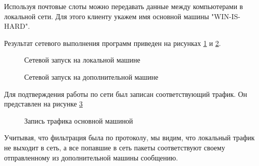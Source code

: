 \documentclass[a4paper]{article}
\begin{document}
	Используя почтовые слоты можно передавать данные между компьютерами в локальной сети. Для этого клиенту укажем имя основной машины "WIN-IS-HARD".
	
	Результат сетевого выполнения программ приведен на рисунках \ref{img:task9_net_local} и \ref{img:task9_net_remote}.
	\begin{figure}[h!]
		\caption{Сетевой запуск на локальной машине}
		\label{img:task9_net_local}
	\end{figure}

	\begin{figure}[h!]
		\caption{Сетевой запуск на дополнительной машине}
		\label{img:task9_net_remote}
	\end{figure}
	
	Для подтверждения работы по сети был записан соответствующий трафик. Он представлен на рисунке \ref{img:task9_wire}
	
	\begin{figure}[h!]
		\caption{Запись трафика основной машиной}
		\label{img:task9_wire}
	\end{figure}
	
	Учитывая, что фильтрация была по протоколу, мы видим, что локальный трафик не выходит в сеть, а все попавшие в сеть пакеты соответствуют своему отправленному из дополнительной машины сообщению.\\
	
\end{document}
